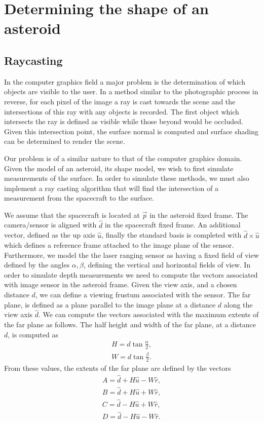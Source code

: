 
\chapter{Determining the shape of an asteroid}

\section{Raycasting}

In the computer graphics field a major problem is the determination of which objects are visible to the user.
In a method similar to the photographic process in reverse, for each pixel of the image a ray is cast towards the scene and the intersections of this ray with any objects is recorded.
The first object which intersects the ray is defined as visible while those beyond would be occluded.
Given this intersection point, the surface normal is computed and surface shading can be determined to render the scene.

Our problem is of a similar nature to that of the computer graphics domain.
Given the model of an asteroid, its shape model, we wish to first simulate measurements of the surface. 
In order to simulate these methods, we must also implement a ray casting algorithm that will find the intersection of a measurement from the spacecraft to the surface. 

We assume that the spacecraft is located at \( \vec p \) in the asteroid fixed frame.
The camera/sensor is aligned with \( \hat d \) in the spacecraft fixed frame.
An additional vector, defined as the up axis \( \hat u\), finally the standard basis is completed with \( \hat d \times \hat u \) which defines a reference frame attached to the image plane of the sensor.
Furthermore, we model the the laser ranging sensor as having a fixed field of view defined by the angles \( \alpha, \beta\), defining the vertical and horizontal fields of view.
In order to simulate depth measurements we need to compute the vectors associated with image sensor in the asteroid frame. 
Given the view axis, and a chosen distance \( d \), we can define a viewing frustum associated with the sensor. 
The far plane, is defined as a plane parallel to the image plane at a distance \( d \) along the view axis \( \hat d \).
We can compute the vectors associated with the maximum extents of the far plane as follows.
The half height and width of the far plane, at a distance \( d \), is computed as
\begin{align}
    H = d \tan \frac{\alpha}{2} , \\
    W = d \tan \frac{\beta}{2} .
\end{align}
From these values, the extents of the far plane are defined by the vectors
\begin{align}
    A = \hat d + H \hat u - W \hat r , \\
    B = \hat d + H \hat u + W \hat r, \\
    C = \hat d - H \hat  u + W \hat r, \\
    D = \hat d - H \hat u - W \hat r.
\end{align}

